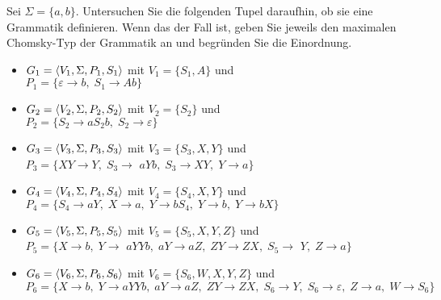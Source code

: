 
\begin{exercise}
  Sei $\Sigma =\{a,b\}$. Untersuchen Sie die folgenden Tupel daraufhin, ob sie eine
  Grammatik definieren. Wenn das der Fall ist, geben Sie
  jeweils den maximalen Chomsky-Typ
  der Grammatik an und begründen Sie die Einordnung.
  \begin{itemize}
   \item $G_{1}=\langle{V_1,\Sigma,P_1,S_1}\rangle$ mit
         $V_1=\{S_{1},A\}$ und\\
         $P_1=\{\varepsilon \rightarrow b,\;S_{1}\rightarrow Ab\}$
   \item $G_{2}=\langle{V_2,\Sigma,P_2,S_2}\rangle$ mit
         $V_2=\{S_{2}\}$ und\\
         $P_2=\{S_{2}\rightarrow aS_{2}b,\;S_{2}\rightarrow \varepsilon\}$
   \item $G_{3}=\langle{V_3,\Sigma,P_3,S_3}\rangle$ mit
         $V_3=\{S_{3},X,Y\}$ und\\
         $P_3=\{XY\rightarrow Y,\;S_{3}\rightarrow$
         $aYb,\;S_{3}\rightarrow XY,\;Y\rightarrow a\}$
   \item $G_{4}=\langle{V_4,\Sigma,P_4,S_4}\rangle$ mit
         $V_{4}=\{S_{4},X,Y\}$ und\\
         $P_{4}=\{S_{4}\rightarrow aY,\;X\rightarrow
         a,\;Y\rightarrow bS_{4},\;Y\rightarrow b,\;Y\rightarrow bX\}$
   \item $G_{5}=\langle{V_5,\Sigma,P_5,S_5}\rangle$ mit
         $V_5=\{S_{5},X,Y,Z\}$ und \\
         $P_5=\{X\rightarrow b,\;Y\rightarrow$
         $aYYb,\;aY\rightarrow aZ,\;ZY\rightarrow ZX,\;S_{5}\rightarrow$
         $Y,\;Z\rightarrow a\}$
   \item $G_{6}=\langle{V_6,\Sigma,P_6,S_6}\rangle$ mit
         $V_6=\{S_{6},W,X,Y,Z\}$ und\\
         $P_6=\{X\rightarrow b,\;Y\rightarrow
         aYYb,\;aY\rightarrow aZ,\;ZY\rightarrow ZX,\;S_{6}\rightarrow
         Y,\;S_{6}\rightarrow \varepsilon,\;Z\rightarrow a,\;W\rightarrow S_{6}\}$
       \end{itemize}
\end{exercise}
